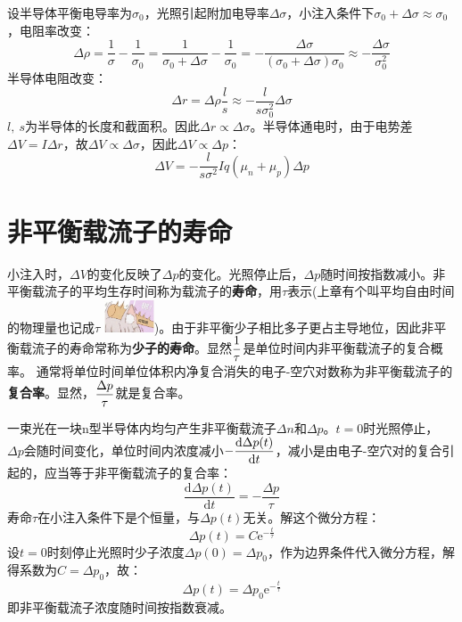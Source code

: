 设半导体平衡电导率为$\sigma_0$，光照引起附加电导率$\Delta \sigma$，小注入条件下$\sigma_0+\Delta \sigma\approx\sigma_0$，电阻率改变：
\begin{equation}
    \Delta\rho=\frac{1}{\sigma}-\frac{1}{\sigma_0}=\frac{1}{\sigma_0+\Delta\sigma}-\frac{1}{\sigma_0}=-\frac{\Delta\sigma}{(\sigma_0+\Delta\sigma)\sigma_0}\approx-\frac{\Delta\sigma}{\sigma_0^2}
\end{equation}
半导体电阻改变：
\begin{equation}
    \Delta r=\Delta\rho\frac{l}{s}\approx-\frac{l}{s\sigma_0^2}\Delta\sigma
\end{equation}
$l,\ s$为半导体的长度和截面积。因此$\Delta r\propto \Delta \sigma$。半导体通电时，由于电势差$\Delta V=I\Delta r$，故$\Delta V\propto\Delta\sigma$，因此$\Delta V\propto\Delta p$：
\begin{equation}
    \Delta V=-\frac{l}{s\sigma^2}Iq(\mu_n+\mu_p)\Delta p
\end{equation}

\section{非平衡载流子的寿命}

小注入时，$\Delta V$的变化反映了$\Delta p$的变化。光照停止后，$\Delta p$随时间按指数减小。非平衡载流子的平均生存时间称为载流子的\textbf{寿命}，用$\tau$表示(上章有个叫平均自由时间的物理量也记成$\tau$ \includegraphics[width=4em, align=c]{idiot.jpg})。由于非平衡少子相比多子更占主导地位，因此非平衡载流子的寿命常称为\textbf{少子的寿命}。显然$\displaystyle \frac{1}{\tau}$是单位时间内非平衡载流子的复合概率。\vspace{1ex}
通常将单位时间单位体积内净复合消失的电子-空穴对数称为非平衡载流子的\textbf{复合率}。显然，$\displaystyle \frac{\Delta p}{\tau}$就是复合率。

一束光在一块n型半导体内均匀产生非平衡载流子$\Delta n$和$\Delta p$。$t=0$时光照停止，\vspace{1ex}
$\Delta p$会随时间变化，单位时间内浓度减小$\displaystyle -\frac{\mathrm{d}\Delta p(t)}{\mathrm{d}t}$，减小是由电子-空穴对的复合引起的，应当等于非平衡载流子的复合率：
\begin{equation}
    \frac{\mathrm{d}\Delta p(t)}{\mathrm{d}t}=-\frac{\Delta p}{\tau}\label{eq:chap-5-uneqilibrium-hole-recombination-equation}
\end{equation}
寿命$\tau$在小注入条件下是个恒量，与$\Delta p(t)$无关。解这个微分方程：
\begin{equation}
    \Delta p(t)=C\mathrm{e}^{-\frac{t}{\tau}}
\end{equation}
设$t=0$时刻停止光照时少子浓度$\Delta p(0)=\Delta p_0$，作为边界条件代入微分方程，解得系数为$C=\Delta p_0$，故：
\begin{equation}
    \Delta p(t)=\Delta p_0\mathrm{e}^{-\frac{t}{\tau}}
\end{equation}
即非平衡载流子浓度随时间按指数衰减。

